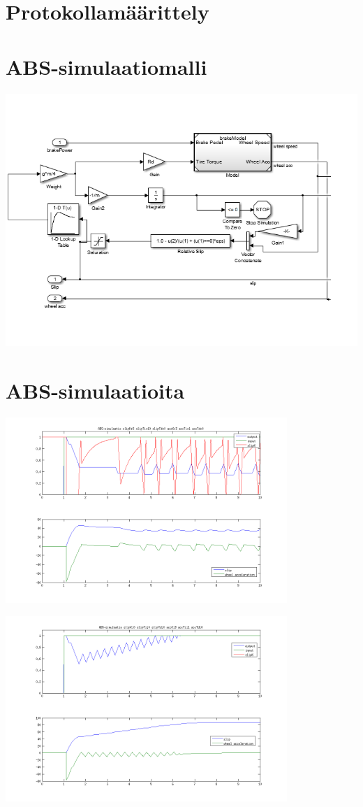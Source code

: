 \documentclass{article}
\newcommand{\kuvaa}[4]{%
	\begin{figure}[h]%
		\centering \texttt{[image: \#2]}%
		\caption{#3 \label{fig:#4}}%
	\end{figure}%
}
\begin{document}
\begin{appendices}
\clearpage
\section{Protokollamäärittely}

\clearpage

\section{ABS-simulaatiomalli} \label{app:simmodel}
{\centering \includegraphics[width=1.0\textwidth]{qrtVehMdl}}

\section{ABS-simulaatioita} \label{app:abssim}
{\centering \includegraphics[width=0.8\textwidth]{abssim1}

 \includegraphics[width=0.8\textwidth]{abssim2}

}
\end{appendices}
\end{document}
